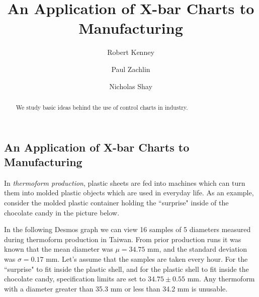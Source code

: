 \documentclass{ximera}
\author{Robert Kenney \and Paul Zachlin \and Nicholas Shay}
\title{An Application of X-bar Charts to Manufacturing} \license{CC BY-NC-SA 4.0}
\begin{document}
\begin{abstract}
We study basic ideas behind the use of control charts in industry.
\end{abstract}
\maketitle

\begin{onlineOnly}
\section*{An Application of X-bar Charts to Manufacturing}
\end{onlineOnly}

In \emph{thermoform production}, plastic sheets are fed into machines which can turn them into molded plastic objects which are used in everyday life.  As an example, consider the molded plastic container holding the ``surprise" inside of the chocolate candy in the picture below.

\begin{center}
      \end{center}

In the following Desmos graph we can view 16 samples of 5 diameters measured during thermoform production in Taiwan.  From prior production runs it was known that the mean diameter was $\mu = 34.75$ mm, and the standard deviation was $\sigma = 0.17$ mm.  Let's assume that the samples are taken every hour.  For the ``surprise" to fit inside the plastic shell, and for the plastic shell to fit inside the chocolate candy, specification limits are set to $34.75\pm 0.55$ mm.  Any thermoform with a diameter greater than 35.3 mm or less than 34.2 mm is unusable.
 
\end{document}
